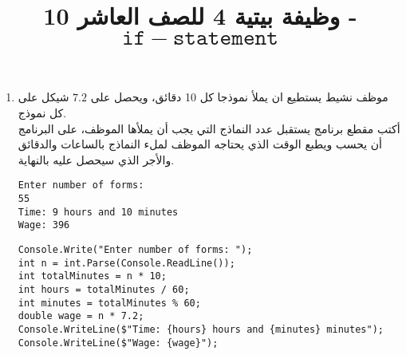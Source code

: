 ﻿\documentclass[12pt]{article}
\title{وظيفة بيتية 4 للصف العاشر 10 - $\mathtt{if-statement}$}
\begin{document}
\maketitle
\thispagestyle{fancy}



\begin{enumerate}[itemsep=3em]

\item
موظف نشيط يستطيع ان يملأ نموذجا كل 10 دقائق، ويحصل على $7.2$ شيكل على كل نموذج. \\
أكتب مقطع برنامج يستقبل عدد النماذج التي يجب أن يملأها الموظف، على البرنامج أن يحسب ويطبع الوقت الذي يحتاجه الموظف لملء النماذج بالساعات والدقائق والأجر الذي سيحصل عليه بالنهاية.
\ifdetailed
\begin{boxExample}
\begin{english}
\begin{verbatim}
Enter number of forms:
55
Time: 9 hours and 10 minutes
Wage: 396
\end{verbatim}
\end{english}
\end{boxExample}
\fi
\ifwithsols
\begin{boxSolution}
\begin{english}
\begin{verbatim}
Console.Write("Enter number of forms: ");
int n = int.Parse(Console.ReadLine());
int totalMinutes = n * 10;
int hours = totalMinutes / 60;
int minutes = totalMinutes % 60;
double wage = n * 7.2;
Console.WriteLine($"Time: {hours} hours and {minutes} minutes");
Console.WriteLine($"Wage: {wage}");
\end{verbatim}
\end{english}
\end{boxSolution}
\clearpage
\fi


\end{enumerate}
\end{document}
